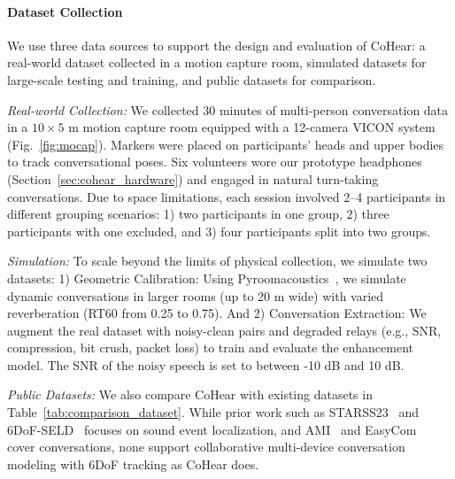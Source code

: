 \paragraph{Dataset Collection}
We use three data sources to support the design and evaluation of CoHear: a real-world dataset collected in a motion capture room, simulated datasets for large-scale testing and training, and public datasets for comparison.

\vspace{1ex}
\noindent\textit{Real-world Collection:}
We collected 30 minutes of multi-person conversation data in a $10 \times 5$ m motion capture room equipped with a 12-camera VICON system (Fig.~\ref{fig:mocap}). Markers were placed on participants’ heads and upper bodies to track conversational poses. Six volunteers wore our prototype headphones (Section~\ref{sec:cohear_hardware}) and engaged in natural turn-taking conversations. Due to space limitations, each session involved 2–4 participants in different grouping scenarios:
1) two participants in one group,
2) three participants with one excluded, and
3) four participants split into two groups.

\vspace{1ex}
\noindent\textit{Simulation:}
To scale beyond the limits of physical collection, we simulate two datasets: 1) Geometric Calibration: Using Pyroomacoustics~\cite{scheibler2018pyroomacoustics}, we simulate dynamic conversations in larger rooms (up to 20 m wide) with varied reverberation (RT60 from 0.25 to 0.75).
And 2) Conversation Extraction: We augment the real dataset with noisy-clean pairs and degraded relays (e.g., SNR, compression, bit crush, packet loss) to train and evaluate the enhancement model. The SNR of the noisy speech is set to between -10 dB and 10 dB.

\vspace{1ex}
\noindent\textit{Public Datasets:}
We also compare CoHear with existing datasets in Table~\ref{tab:comparison_dataset}. While prior work such as STARSS23~\cite{shimada2024starss23} and 6DoF-SELD~\cite{yasuda20246dof} focuses on sound event localization, and AMI~\cite{kraaij2005ami} and EasyCom~\cite{donley2021easycom} cover conversations, none support collaborative multi-device conversation modeling with 6DoF tracking as CoHear does.

